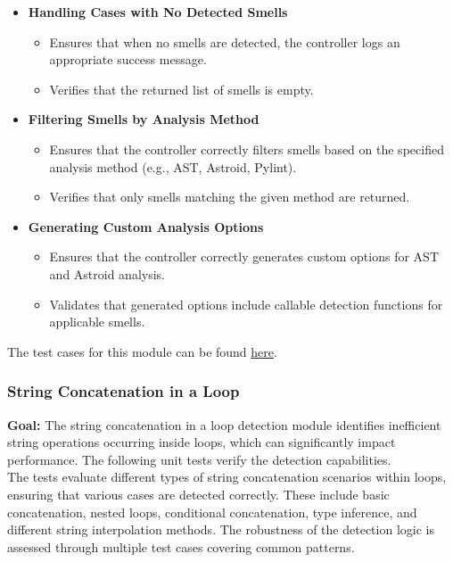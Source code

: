 \documentclass[12pt, titlepage]{article}
\begin{document}
\begin{enumerate}[label={\bf \textcolor{Maroon}{test-SRT-\arabic*}}, wide=0pt, font=\itshape]
\begin{itemize}
    \item \textbf{Handling Cases with No Detected Smells}
    \begin{itemize}
        \item Ensures that when no smells are detected, the controller logs an appropriate success message.
        \item Verifies that the returned list of smells is empty.
    \end{itemize}

    \item \textbf{Filtering Smells by Analysis Method}
    \begin{itemize}
        \item Ensures that the controller correctly filters smells based on the specified analysis method (e.g., AST, Astroid, Pylint).
        \item Verifies that only smells matching the given method are returned.
    \end{itemize}

    \item \textbf{Generating Custom Analysis Options}
    \begin{itemize}
        \item Ensures that the controller correctly generates custom options for AST and Astroid analysis.
        \item Validates that generated options include callable detection functions for applicable smells.
    \end{itemize}
\end{itemize}

\noindent The test cases for this module can be found \href{https://github.com/ssm-lab/capstone--source-code-optimizer/blob/new-poc/tests/controllers/test_analyzer_controller.py}{here}.

\subsubsection{String Concatenation in a Loop}

\textbf{Goal:} The string concatenation in a loop detection module identifies inefficient string operations occurring inside loops, which can significantly impact performance. The following unit tests verify the detection capabilities.\\

\noindent The tests evaluate different types of string concatenation scenarios within loops, ensuring that various cases are detected correctly. These include basic concatenation, nested loops, conditional concatenation, type inference, and different string interpolation methods. The robustness of the detection logic is assessed through multiple test cases covering common patterns.\\


\end{enumerate}
\end{document}
